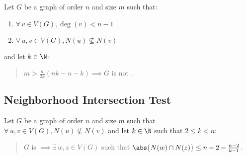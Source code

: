 \begin{corollary}
  \label{cor:tighter}
  Let \(G\) be a graph of order \(n\) and size \(m\) such that:
  \begin{enumerate}
  \item \(\forall\,v\in V(G),\deg(v)<n-1\)
  \item \(\forall\,u,v\in V(G),N(u)\not\subseteq N(v)\)
  \end{enumerate}
  and let \(k\in\N\):
  \begin{quote}
    \(\displaystyle m>\frac{n}{2k}(nk-n-k)\implies G\) is not .
  \end{quote}
\end{corollary}

\subsection*{Neighborhood Intersection Test}

\begin{lemma}
  \label{lem:inter}
  Let \(G\) be a graph of order \(n\) and size \(m\) such that \(\forall\,u,v\in V(G),N(u)\not\subseteq N(v)\) and let
  \(k\in\N\) such that \(2\le k<n\):
  \begin{quote}
    \(G\) is  \(\implies\exists\,w,z\in V(G)\) such that \(\abs{N(w)\cap N(z)}\le n-2-\frac{n-2}{k-1}\).
  \end{quote}
\end{lemma}

